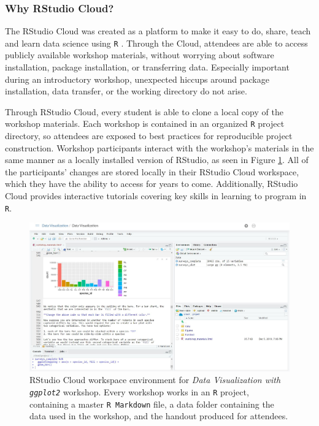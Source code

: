 \documentclass[12pt]{article}
\begin{document}
\subsubsection{Why RStudio Cloud?} 

\quad The RStudio Cloud was created as a platform to make it easy to do, share, teach and learn data science using \texttt{R} \citep{RStudioCloud}. Through the Cloud, attendees are able to access publicly available workshop materials, without worrying about software installation, package installation, or transferring data. Especially important during an introductory workshop, unexpected hiccups around package installation, data transfer, or the working directory do not arise. 

\quad Through RStudio Cloud, every student is able to clone a local copy of the workshop materials. Each workshop is contained in an organized \texttt{R} project directory, so attendees are exposed to best practices for reproducible project construction. Workshop participants interact with the workshop's materials in the same manner as a locally installed version of RStudio, as seen in Figure \ref{fig:cloud}. All of the participants' changes are stored locally in their RStudio Cloud workspace, which they have the ability to access for years to come. Additionally, RStudio Cloud provides interactive tutorials covering key skills in learning to program in \texttt{R}. 

\begin{figure}[h!]
    \centering
    \includegraphics[width = \textwidth]{images/RStudio_Cloud_blind.png}
    \caption{RStudio Cloud workspace environment for \emph{Data Visualization with \texttt{ggplot2}} workshop. Every workshop works in an \texttt{R} project, containing a master \texttt{R Markdown} file, a data folder containing the data used in the workshop, and the handout produced for attendees.} 
    \label{fig:cloud}
\end{figure}
\end{document}
